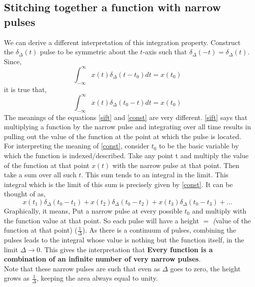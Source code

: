 \subsection{Stitching together a function with narrow pulses}
We can derive a different interpretation of this integration property. Construct the $\delta_{\Delta}(t)$ pulse to be symmetric about the $t$-axis such that $\delta_{\Delta}(-t) = \delta_{\Delta}(t)$.  %
Since, 
\begin{equation} \label{sift}
\int_{-\infty}^\infty x(t) \delta_{\Delta}(t - t_{0}) dt = x(t_{0})
\end{equation}
it is true that, 
\begin{equation} \label{const}
\int_{-\infty}^\infty x(t) \delta_{\Delta}( t_{0} - t) dt = x(t_{0})
\end{equation}
The meanings of the equations \eqref{sift} and \eqref{const} are very different. \eqref{sift} says that multiplying a function by the narrow pulse and integrating over all time results in pulling out the value of the function at the point at which the pulse is located.
\\

For interpreting the meaning of \eqref{const}, consider $t_{0}$ to be the basic variable by which the function is indexed/described. Take any point t and multiply the value of the function at that point $x(t)$ with the narrow pulse at that point. Then take a sum over all such $t$. This sum tends to an integral in the limit. This integral which is the limit of this sum is precisely given by \eqref{const}. It can be thought of as,
\begin{equation}
x(t_{1})\delta_{\Delta}(t_{0} - t_{1}) + x(t_{2})\delta_{\Delta}(t_{0} - t_{2}) + x(t_{3})\delta_{\Delta}(t_{0} - t_{3}) + ...
\end{equation}
Graphically, it means, %
Put a narrow pulse at every possible $t_{0}$ and multiply with the function value at that point. So each pulse will have a height $=$ \textit({value of the function at that point}) ($\frac{1}{\Delta}$). As there is a continuum of pulses, combining the pulses leads to the integral whose value is nothing but the function itself, in the limit $\Delta \rightarrow 0$. This gives the interpretation that 
\textbf{Every function is a combination of an infinite number of very narrow pulses}.
\\

Note that these narrow pulses are such that even as $\Delta$ goes to zero, the height grows as $\frac{1}{\Delta}$, keeping the area always equal to unity. 